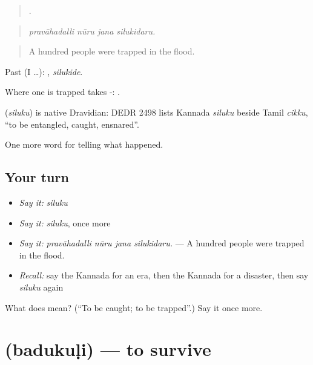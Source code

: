 \begin{quote}
   .
\end{quote}

\begin{quote}
\emph{pravāhadalli nūru jana silukidaru.}
\end{quote}

\begin{quote}
A hundred people were trapped in the flood.
\end{quote}

Past (I …): , \emph{silukide}.

Where one is trapped takes -:  .

\begin{cousinweb}
\textbf{} (\emph{siluku}) is native Dravidian: DEDR 2498 lists Kannada \emph{siluku} beside Tamil \emph{cikku}, \textquotedblleft{}to be entangled, caught, ensnared\textquotedblright{}.
\end{cousinweb}

\begin{grammarlens}[title={What you've built}]
One more word for telling what happened.
\end{grammarlens}

\subsection*{Your turn}
\begin{itemize}
\raggedright
  \item \emph{Say it:} \emph{siluku}
  \item \emph{Say it:} \emph{siluku}, once more
  \item \emph{Say it:} \emph{pravāhadalli nūru jana silukidaru.} — A hundred people were trapped in the flood.
  \item \emph{Recall:} say the Kannada for an era, then the Kannada for a disaster, then say \emph{siluku} again
\end{itemize}

\begin{tcolorbox}[breakable,colback=teal!4,colframe=teal!35!black,title={Before you move on}]
What does  mean? (\textquotedblleft{}To be caught; to be trapped\textquotedblright{}.) Say it once more.
\end{tcolorbox}
\section[\texorpdfstring{\kn{ಬದುಕುಳಿ} (badukuḷi)}{ಬದುಕುಳಿ (badukuḷi)}]{ (badukuḷi) — to survive}

